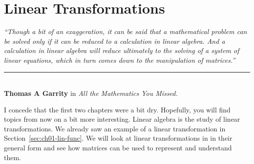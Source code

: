\chapter{Linear Transformations}\label{chp:lintrans}


\begin{flushright}
\textit{``Though a bit of an exaggeration, it can be said that a mathematical problem can be solved only if it can be reduced to a calculation in linear algebra. And a calculation in linear algebra will reduce ultimately to the solving of a system of linear equations, which in turn comes down to the manipulation of matrices.''}\\
\rule{0.5\textwidth}{.4pt}\\
\textbf{Thomas A Garrity} \small{in \textit{All the Mathematics You Missed.}}
\end{flushright}

I concede that the first two chapters were a bit dry. Hopefully, you will find topics from now on a bit more interesting. Linear algebra is the study of linear transformations. We already saw an example of a linear transformation in Section~\ref{sec:ch01-lin-func}. We will look at linear transformations in in their general form and see how matrices can be used to represent and understand them.

